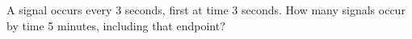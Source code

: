 A signal occurs every 3 seconds, first at time 3 seconds. How many signals occur by time 5 minutes, including that endpoint?
